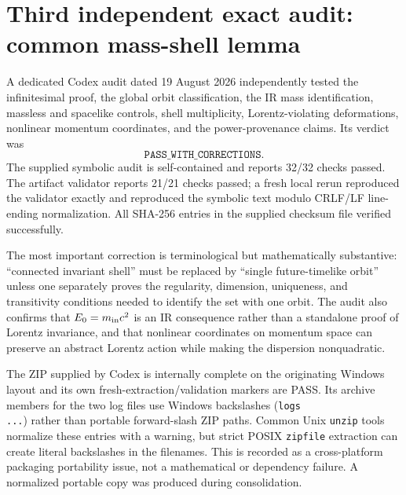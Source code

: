 \documentclass[11pt,a4paper]{article}
\begin{document}
\section{Third independent exact audit: common mass-shell lemma}
A dedicated Codex audit dated 19 August 2026 independently tested the infinitesimal proof, the global orbit classification, the IR mass identification, massless and spacelike controls, shell multiplicity, Lorentz-violating deformations, nonlinear momentum coordinates, and the power-provenance claims.  Its verdict was
\begin{equation}
\boxed{\texttt{PASS\_WITH\_CORRECTIONS}}.
\end{equation}
The supplied symbolic audit is self-contained and reports 32/32 checks passed.  The artifact validator reports 21/21 checks passed; a fresh local rerun reproduced the validator exactly and reproduced the symbolic text modulo CRLF/LF line-ending normalization.  All SHA-256 entries in the supplied checksum file verified successfully.

The most important correction is terminological but mathematically substantive: ``connected invariant shell'' must be replaced by ``single future-timelike orbit'' unless one separately proves the regularity, dimension, uniqueness, and transitivity conditions needed to identify the set with one orbit.  The audit also confirms that $E_0=m_{\rm in}c^2$ is an IR consequence rather than a standalone proof of Lorentz invariance, and that nonlinear coordinates on momentum space can preserve an abstract Lorentz action while making the dispersion nonquadratic.

The ZIP supplied by Codex is internally complete on the originating Windows layout and its own fresh-extraction/validation markers are PASS.  Its archive members for the two log files use Windows backslashes (\texttt{logs\\...}) rather than portable forward-slash ZIP paths.  Common Unix \texttt{unzip} tools normalize these entries with a warning, but strict POSIX \texttt{zipfile} extraction can create literal backslashes in the filenames.  This is recorded as a cross-platform packaging portability issue, not a mathematical or dependency failure.  A normalized portable copy was produced during consolidation.
\end{document}
